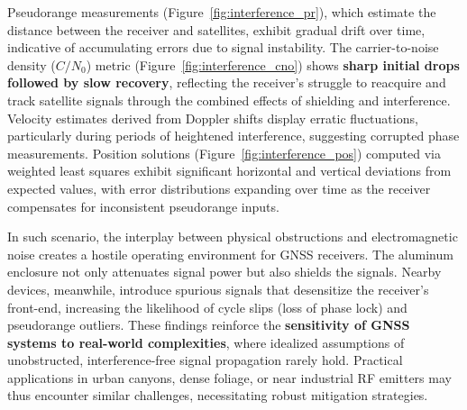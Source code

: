         Pseudorange measurements (Figure~\ref{fig:interference_pr}), which estimate the distance between the receiver and satellites, exhibit gradual drift over time, indicative of accumulating errors due to signal instability. The carrier-to-noise density ($C/N_0$) metric (Figure~\ref{fig:interference_cno}) shows \textbf{sharp initial drops followed by slow recovery}, reflecting the receiver's struggle to reacquire and track satellite signals through the combined effects of shielding and interference. Velocity estimates derived from Doppler shifts display erratic fluctuations, particularly during periods of heightened interference, suggesting corrupted phase measurements. Position solutions (Figure~\ref{fig:interference_pos}) computed via weighted least squares exhibit significant horizontal and vertical deviations from expected values, with error distributions expanding over time as the receiver compensates for inconsistent pseudorange inputs.
        

        \noindent
        In such scenario, the interplay between physical obstructions and electromagnetic noise creates a hostile operating environment for GNSS receivers. The aluminum enclosure not only attenuates signal power but also shields the signals. Nearby devices, meanwhile, introduce spurious signals that desensitize the receiver's front-end, increasing the likelihood of cycle slips (loss of phase lock) and pseudorange outliers. These findings reinforce the \textbf{sensitivity of GNSS systems to real-world complexities}, where idealized assumptions of unobstructed, interference-free signal propagation rarely hold. Practical applications in urban canyons, dense foliage, or near industrial RF emitters may thus encounter similar challenges, necessitating robust mitigation strategies.
        

